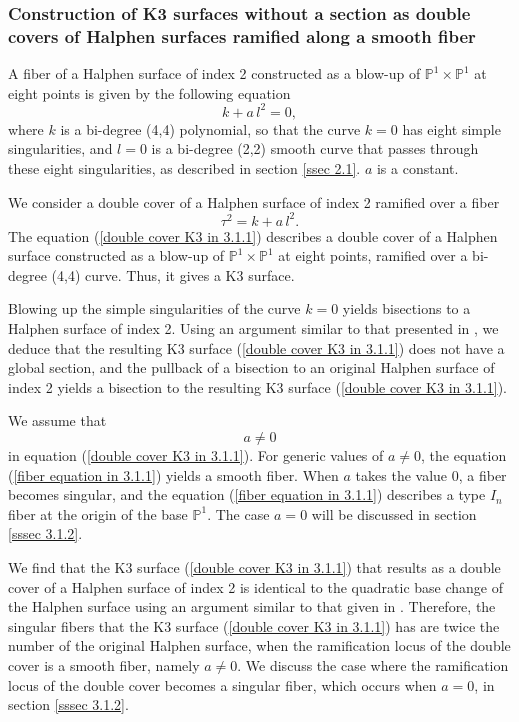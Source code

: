 \documentclass[12pt]{article}
\def\P{\mathbb{P}}
\begin{document}
\subsubsection{Construction of K3 surfaces without a section as double covers of Halphen surfaces ramified along a smooth fiber}
\label{sssec 3.1.1}
A fiber of a Halphen surface of index 2 constructed as a blow-up of $\P^1\times\P^1$ at eight points is given by the following equation
\begin{equation}
\label{fiber equation in 3.1.1}
k +a\, l^2=0,
\end{equation}
where $k$ is a bi-degree (4,4) polynomial, so that the curve $k=0$ has eight simple singularities, and $l=0$ is a bi-degree (2,2) smooth curve that passes through these eight singularities, as described in section \ref{ssec 2.1}. $a$ is a constant.
\par We consider a double cover of a Halphen surface of index 2 ramified over a fiber 
\begin{equation}
\label{double cover K3 in 3.1.1}
\tau^2 = k +a\, l^2.
\end{equation}
The equation (\ref{double cover K3 in 3.1.1}) describes a double cover of a Halphen surface constructed as a blow-up of $\P^1\times\P^1$ at eight points, ramified over a bi-degree (4,4) curve. Thus, it gives a K3 surface.
\par Blowing up the simple singularities of the curve $k=0$ yields bisections to a Halphen surface of index 2. Using an argument similar to that presented in \cite{Kimura1801}, we deduce that the resulting K3 surface (\ref{double cover K3 in 3.1.1}) does not have a global section, and the pullback of a bisection to an original Halphen surface of index 2 yields a bisection to the resulting K3 surface (\ref{double cover K3 in 3.1.1}). 
\par We assume that 
\begin{equation}
a \ne 0
\end{equation}
in equation (\ref{double cover K3 in 3.1.1}). For generic values of $a\ne 0$, the equation (\ref{fiber equation in 3.1.1}) yields a smooth fiber. When $a$ takes the value 0, a fiber becomes singular, and the equation (\ref{fiber equation in 3.1.1}) describes a type $I_n$ fiber at the origin of the base $\P^1$. The case $a=0$ will be discussed in section \ref{sssec 3.1.2}. 
\par We find that the K3 surface (\ref{double cover K3 in 3.1.1}) that results as a double cover of a Halphen surface of index 2 is identical to the quadratic base change of the Halphen surface using an argument similar to that given in \cite{Kimura1801}. Therefore, the singular fibers that the K3 surface (\ref{double cover K3 in 3.1.1}) has are twice the number of the original Halphen surface, when the ramification locus of the double cover is a smooth fiber, namely $a \ne 0$. We discuss the case where the ramification locus of the double cover becomes a singular fiber, which occurs when $a=0$, in section \ref{sssec 3.1.2}. 
\end{document}
